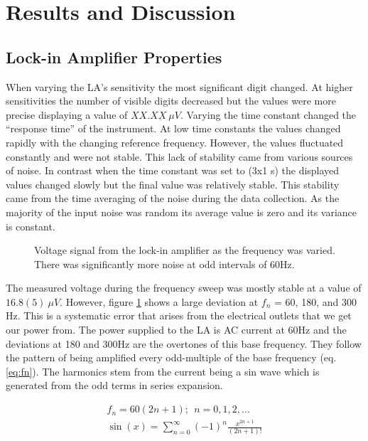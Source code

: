 \documentclass[
reprint,
amsmath,amssymb,
aps,
tikz,
border=5pt
]{revtex4-1}
\begin{document}
\section*{Results \lowercase{and} Discussion }

  \subsection*{Lock-in Amplifier Properties}

    When varying the LA's  sensitivity the most significant digit changed. At higher sensitivities the number of visible digits decreased but the values were more precise displaying a value of $XX.X\underbar{X} ~\mu V$. Varying the time constant changed the  ``response time'' of the instrument. At low time constants the values changed rapidly with the changing reference frequency. However, the values fluctuated constantly and were not stable. This lack of stability came from various sources of noise. In contrast when the time constant was set to (3x1 s) the displayed values changed slowly but the final value was relatively stable. This stability came from the time averaging of the noise during the data collection. As the majority of the input noise was random its average value is zero and its variance is constant. 


    \begin{figure}[h]
    
      \resizebox{0.45\textwidth}{!}{}
      \caption{Voltage signal from the lock-in amplifier as the frequency was varied. There was significantly more noise at odd intervals of 60Hz. }
      \label{fig:freq_dep}
  
    \end{figure}

    The measured voltage during the frequency sweep was mostly stable at a value of $16.8(5) ~\mu V$. However, figure \ref{fig:freq_dep} shows a large deviation at $f_n$ = 60, 180, and 300 Hz. This is a systematic error that arises from the electrical outlets that we get our power from. The power supplied to the LA is AC current at 60Hz and the deviations at 180 and 300Hz are the overtones of this base frequency.\cite{harmonics} They follow the pattern of being amplified every odd-multiple of the base frequency (eq. \ref{eq:fn}). The harmonics stem from the current being a sin wave which is generated from the odd terms in series expansion.
    
    \begin{gather}
      f_n = 60(2n+1); ~~{n = 0, 1, 2, \dots}
      \label{eq:fn} \\
      \sin(x) = \sum_{n=0}^{\infty} \left(-1\right)^n \frac{x^{2n +1}}{(2n+1)!} \label{eq:sin_taylor}
    \end{gather}
    
\end{document}

